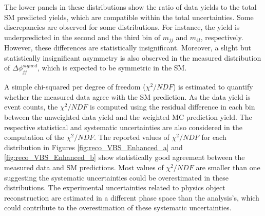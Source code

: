The lower panels in these distributions show the ratio of data yields to the total SM predicted yields, which are compatible within the total uncertainties. Some discrepancies are observed for some distributions. For instance, the yield is underpredicted in the second and the third bin of $m_{jj}$ and $m_{4l}$, respectively. However, these differences are statistically insignificant. Moreover, a slight but statistically insignificant asymmetry is also observed in the measured distribution of $\Delta \phi _{jj}^{signed}$, which is expected to be symmetric in the SM. 

A simple chi-squared per degree of freedom ($\chi^2/NDF$) is estimated to quantify whether the measured data agree with the SM prediction. As the data yield is event counts, the $\chi^2/NDF$ is computed using the residual difference in each bin between the unweighted data yield and the weighted MC prediction yield. The respective statistical and systematic uncertainties are also considered in the computation of the $\chi^2/NDF$. The reported values of $\chi^2/NDF$ for each distribution in Figures \ref{fig:reco_VBS_Enhanced_a} and \ref{fig:reco_VBS_Enhanced_b} show statistically good agreement between the measured data and SM predictions. Most values of $\chi^2/NDF$ are smaller than one suggesting the systematic uncertainties could be overestimated in these distributions. The experimental uncertainties related to physics object reconstruction are estimated in a different phase space than the analysis's, which could contribute to the overestimation of these systematic uncertainties. 

